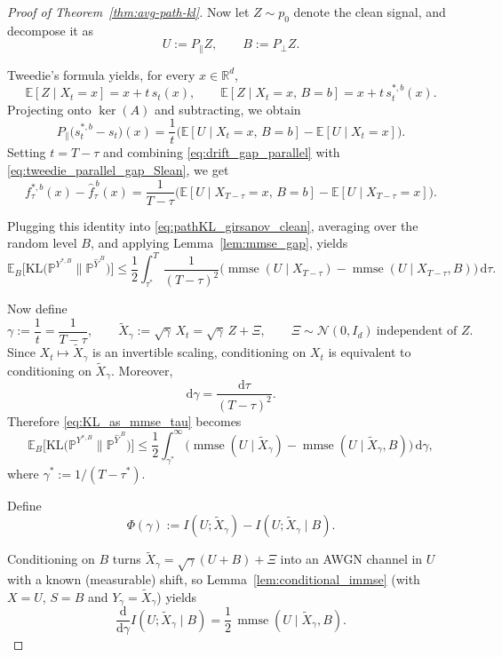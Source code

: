 \documentclass[twoside,11pt]{article}
\DeclareMathOperator{\mmse}{mmse}
\newcommand{\R}{\mathbb{R}}
\newcommand{\E}{\mathbb{E}}
\newcommand{\PP}{\mathbb{P}}
\newcommand{\Nc}{\mathcal{N}}
\newcommand{\dd}{\mathrm{d}}
\newcommand{\KL}{\mathrm{KL}}
\numberwithin{equation}{section}
\begin{document}
\begin{proof}[Proof of Theorem~\ref{thm:avg-path-kl}]
Now let \(Z\sim p_0\) denote the clean signal, and decompose it as
\[
U:=P_\parallel Z,
\qquad
B:=P_\perp Z.
\]


Tweedie's formula yields, for every \(x\in\R^d\),
\[
\E[Z\mid X_t=x]
=
x+t\,s_t(x),
\qquad
\E[Z\mid X_t=x,\,B=b]
=
x+t\,s_t^{*,b}(x).
\]
Projecting onto \(\ker(A)\) and subtracting, we obtain
\begin{equation}\label{eq:tweedie_parallel_gap_Slean}
P_\parallel\!\big(s_t^{*,b}-s_t\big)(x)
=
\frac1t\Big(\E[U\mid X_t=x,\,B=b]-\E[U\mid X_t=x]\Big).
\end{equation}
Setting \(t=T-\tau\) and combining \eqref{eq:drift_gap_parallel} with
\eqref{eq:tweedie_parallel_gap_Slean}, we get
\[
f_\tau^{*,b}(x)-\hat f_\tau^{\,b}(x)
=
\frac{1}{T-\tau}\Big(\E[U\mid X_{T-\tau}=x,\,B=b]-\E[U\mid X_{T-\tau}=x]\Big).
\]

Plugging this identity into \eqref{eq:pathKL_girsanov_clean}, averaging over the random level
\(B\), and applying Lemma~\ref{lem:mmse_gap}, yields
\begin{equation}\label{eq:KL_as_mmse_tau}
\E_B\!\Big[\KL\!\big(\PP^{Y^{*,B}}\big\|\PP^{\hat Y^{\,B}}\big)\Big]
\le
\frac12\int_{\tau^*}^{T}
\frac{1}{(T-\tau)^2}
\Big(
\mmse(U\mid X_{T-\tau})-\mmse(U\mid X_{T-\tau},B)
\Big)\,\dd\tau .
\end{equation}

Now define
\[
\gamma:=\frac1t=\frac{1}{T-\tau},
\qquad
\tilde X_\gamma:=\sqrt{\gamma}\,X_t
=
\sqrt{\gamma}\,Z+\Xi,
\qquad
\Xi\sim\Nc(0,I_d)\ \text{independent of }Z.
\]
Since \(X_t\mapsto \tilde X_\gamma\) is an invertible scaling, conditioning on \(X_t\) is
equivalent to conditioning on \(\tilde X_\gamma\). Moreover,
\[
\dd\gamma=\frac{\dd\tau}{(T-\tau)^2}.
\]
Therefore \eqref{eq:KL_as_mmse_tau} becomes
\begin{equation}\label{eq:KL_as_mmse_gamma}
\E_B\!\Big[\KL\!\big(\PP^{Y^{*,B}}\big\|\PP^{\hat Y^{\,B}}\big)\Big]
\le
\frac12\int_{\gamma^*}^{\infty}
\Big(
\mmse(U\mid \tilde X_\gamma)-\mmse(U\mid \tilde X_\gamma,B)
\Big)\,\dd\gamma,
\end{equation}
where \(\gamma^*:=1/(T-\tau^*)\).

Define
\[
\Phi(\gamma):=I(U;\tilde{X}_\gamma)-I(U;\tilde{X}_\gamma\mid B).
\]

Conditioning on $B$ turns $\tilde{X}_\gamma=\sqrt{\gamma}(U+B)+\Xi$ into an AWGN
channel in $U$ with a known (measurable) shift, so Lemma~\ref{lem:conditional_immse}
(with $X=U$, $S=B$ and $Y_\gamma=\tilde{X}_\gamma$) yields
\begin{equation}\label{eq:dI_cond}
\frac{\dd}{\dd\gamma}I(U;\tilde{X}_\gamma\mid B)
=\frac12\,\mmse(U\mid \tilde{X}_\gamma,B).
\end{equation}


\end{proof}
\end{document}
